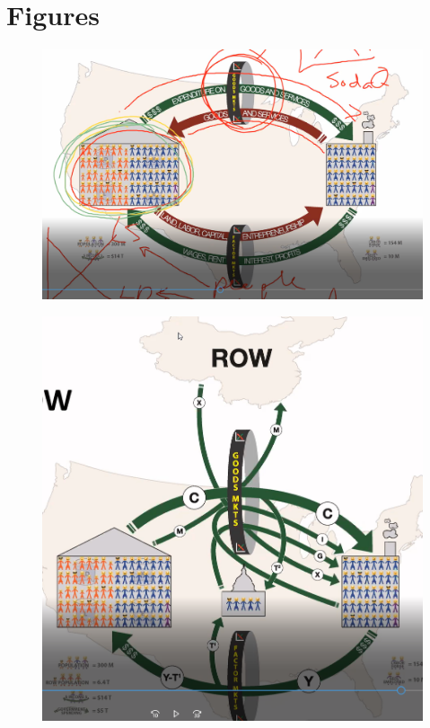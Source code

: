 \documentclass[openany]{book}
\begin{document}
\chapter{Figures}
\begin{figure}[H]
    \centering
    \includegraphics[width=14cm]{figs/Captura.PNG} 
\end{figure}
\begin{figure}[H]
    \centering
    \includegraphics[width=14cm]{figs/Captura1.PNG}  
\end{figure}
\end{document}
